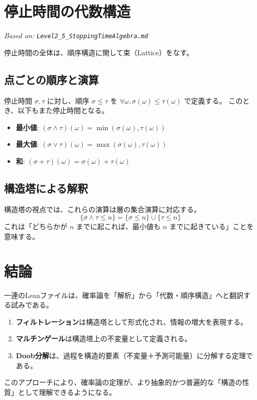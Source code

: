 \documentclass[a4paper,11pt]{ltjsarticle}
\theoremstyle{definition}
\begin{document}
\section{停止時間の代数構造}
\label{sec:algebra}
\textit{Based on: \texttt{Level2\_5\_StoppingTimeAlgebra.md}}

停止時間の全体は、順序構造に関して束（Lattice）をなす。

\subsection{点ごとの順序と演算}
停止時間 $\sigma, \tau$ に対し、順序 $\sigma \le \tau$ を $\forall \omega, \sigma(\omega) \le \tau(\omega)$ で定義する。
このとき、以下もまた停止時間となる。
\begin{itemize}
    \item \textbf{最小値}: $(\sigma \land \tau)(\omega) = \min(\sigma(\omega), \tau(\omega))$
    \item \textbf{最大値}: $(\sigma \lor \tau)(\omega) = \max(\sigma(\omega), \tau(\omega))$
    \item \textbf{和}: $(\sigma + \tau)(\omega) = \sigma(\omega) + \tau(\omega)$
\end{itemize}

\subsection{構造塔による解釈}
構造塔の視点では、これらの演算は層の集合演算に対応する。
\[ \{\sigma \land \tau \le n\} = \{\sigma \le n\} \cup \{\tau \le n\} \]
これは「どちらかが $n$ までに起これば、最小値も $n$ までに起きている」ことを意味する。

\section{結論}
一連のLeanファイルは、確率論を「解析」から「代数・順序構造」へと翻訳する試みである。
\begin{enumerate}
    \item \textbf{フィルトレーション}は構造塔として形式化され、情報の増大を表現する。
    \item \textbf{マルチンゲール}は構造塔上の不変量として定義される。
    \item \textbf{Doob分解}は、過程を構造的要素（不変量＋予測可能量）に分解する定理である。
\end{enumerate}
このアプローチにより、確率論の定理が、より抽象的かつ普遍的な「構造の性質」として理解できるようになる。
\end{document}
